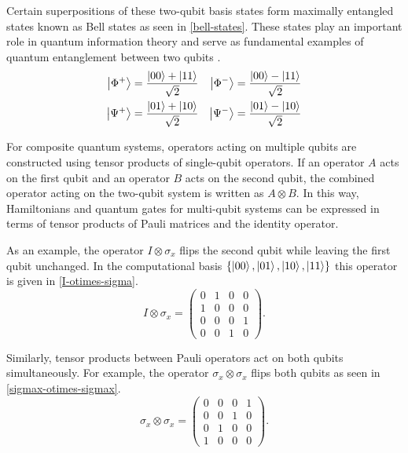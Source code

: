 Certain superpositions of these two-qubit basis states form maximally entangled states known as Bell states as seen in \cref{bell-states}. These states play an important role in quantum information theory and serve as fundamental examples of quantum entanglement between two qubits \parencite{einstein1935epr,nielsen2000qci}.
\begin{equation}\label{bell-states}
\begin{aligned}
\left| \Phi^+ \right\rangle &= \frac{\left| 00 \right\rangle + \left| 11 \right\rangle}{\sqrt{2}} &
\left| \Phi^- \right\rangle &= \frac{\left| 00 \right\rangle - \left| 11 \right\rangle}{\sqrt{2}} \\
\left| \Psi^+ \right\rangle &= \frac{\left| 01 \right\rangle + \left| 10 \right\rangle}{\sqrt{2}} &
\left| \Psi^- \right\rangle &= \frac{\left| 01 \right\rangle - \left| 10 \right\rangle}{\sqrt{2}}
\end{aligned}
\end{equation}

For composite quantum systems, operators acting on multiple qubits are constructed using tensor products of single-qubit operators. If an operator $A$ acts on the first qubit and an operator $B$ acts on the second qubit, the combined operator acting on the two-qubit system is written as $A \otimes B$. In this way, Hamiltonians and quantum gates for multi-qubit systems can be expressed in terms of tensor products of Pauli matrices and the identity operator.

As an example, the operator $I \otimes \sigma_x$ flips the second qubit while leaving the first qubit unchanged. In the computational basis $\{\left| 00 \right\rangle,\left| 01 \right\rangle,\left| 10 \right\rangle,\left| 11 \right\rangle\}$ this operator is given in \cref{I-otimes-sigma}.
\begin{equation}\label{I-otimes-sigma}
I \otimes \sigma_x =
\begin{pmatrix}
0 & 1 & 0 & 0 \\
1 & 0 & 0 & 0 \\
0 & 0 & 0 & 1 \\
0 & 0 & 1 & 0
\end{pmatrix}.
\end{equation}

Similarly, tensor products between Pauli operators act on both qubits simultaneously. For example, the operator $\sigma_x \otimes \sigma_x$ flips both qubits as seen in \cref{sigmax-otimes-sigmax}.
\begin{equation}\label{sigmax-otimes-sigmax}
\sigma_x \otimes \sigma_x =
\begin{pmatrix}
0 & 0 & 0 & 1 \\
0 & 0 & 1 & 0 \\
0 & 1 & 0 & 0 \\
1 & 0 & 0 & 0
\end{pmatrix}.
\end{equation}

